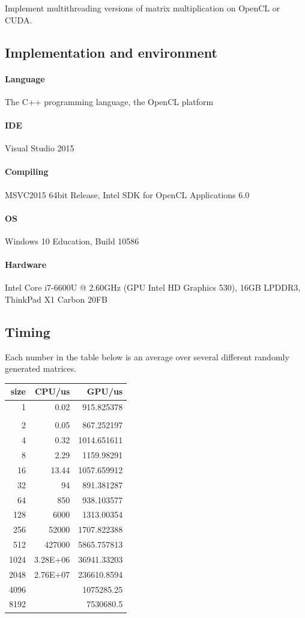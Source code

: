 \begin{homeworkProblem}

Implement multithreading versions of matrix multiplication on OpenCL or CUDA.

\subsection{Implementation and environment}
\paragraph{Language} The C++ programming language, the OpenCL platform
\paragraph{IDE} Visual Studio 2015
\paragraph{Compiling} MSVC2015 64bit Release, Intel SDK for OpenCL Applications 6.0
\paragraph{OS} Windows 10 Education, Build 10586
\paragraph{Hardware} Intel Core i7-6600U @ 2.60GHz (GPU Intel HD Graphics 530), 16GB LPDDR3, ThinkPad X1 Carbon 20FB


\subsection{Timing}
Each number in the table below is an average over several different randomly generated matrices.
\begin{center}
\begin{tabular}{rrr}
\hline
size& CPU/us& GPU/us\\
\hline
1& 	0.02& 	915.825378\\\\
2& 	0.05& 	867.252197\\
4& 	0.32& 	1014.651611\\
8& 	2.29& 	1159.98291\\
16& 	13.44& 	1057.659912\\
32& 	94& 	891.381287\\
64& 	850& 	938.103577\\
128& 	6000& 	1313.00354\\
256& 	52000& 	1707.822388\\
512& 	427000& 	5865.757813\\
1024& 	3.28E+06& 	36941.33203\\
2048& 	2.76E+07& 	236610.8594\\
4096& 	& 	1075285.25\\
8192& 	& 	7530680.5\\
\hline
\end{tabular}
\end{center}


\end{homeworkProblem}
